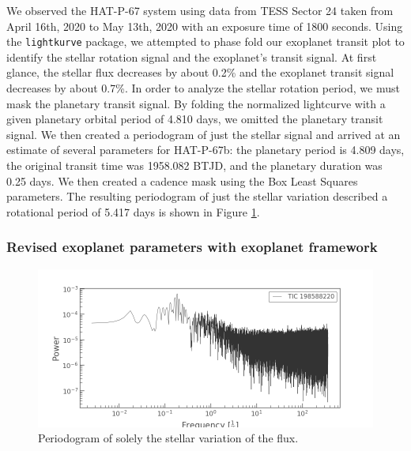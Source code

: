 \documentclass[modern]{aastex631}
\begin{document}
We observed the HAT-P-67 system using data from TESS Sector 24 taken from April 16th, 2020 to May 13th, 2020 with an exposure time of 1800 seconds. Using the \texttt{lightkurve} package, we attempted to phase fold our exoplanet transit plot to identify the stellar rotation signal and the exoplanet's transit signal. At first glance, the stellar flux decreases by about 0.2\% and the exoplanet transit signal decreases by about 0.7\%. In order to analyze the stellar rotation period, we must mask the planetary transit signal. By folding the normalized lightcurve with a given planetary orbital period of 4.810 days, we omitted the planetary transit signal. We then created a periodogram of just the stellar signal and arrived at an estimate of several parameters for HAT-P-67b: the planetary period is 4.809 days, the original transit time was 1958.082 BTJD, and the planetary duration was 0.25 days. We then created a cadence mask using the Box Least Squares parameters. The resulting periodogram of just the stellar variation described a rotational period of 5.417 days is shown in Figure \ref{fig:stellar_periodogram}.

\subsubsection{Revised exoplanet parameters with exoplanet framework}

\begin{figure}
    \includegraphics[width=\linewidth]{figures/stellar_periodogram.png}
    \caption{Periodogram of solely the stellar variation of the flux. }
    \label{fig:stellar_periodogram}
\end{figure}
\end{document}
